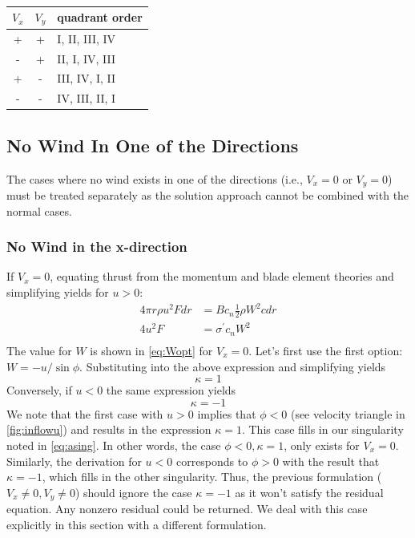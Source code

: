 \documentclass{article}
\begin{document}
\begin{table}[htb]
\centering
\caption{}
\label{tab:brackets}
\begin{tabular}{@{}ccl@{}}
\toprule
$V_x$ & $V_y$ & quadrant order \\
\midrule
+ & + & I, II, III, IV \\
- & + & II, I, IV, III \\
+ & - & III, IV, I, II \\
- & - & IV, III, II, I \\
\bottomrule
\end{tabular}
\end{table}



\subsection{No Wind In One of the Directions}

The cases where no wind exists in one of the directions (i.e., $V_x = 0$ or $V_y = 0$) must be treated separately as the solution approach cannot be combined with the normal cases.

\subsubsection{No Wind in the x-direction}
If $V_x = 0$, equating thrust from the momentum and blade element theories and simplifying yields for $u > 0$:
\begin{equation}
\begin{aligned}
    4 \pi r \rho u^2 F dr &= B c_n \frac{1}{2} \rho W^2 c dr\\
    4 u^2 F&= \sigma^\prime c_n W^2\\
\end{aligned}
\end{equation}
The value for $W$ is shown in \cref{eq:Wopt} for $V_x = 0$.  Let's first use the first option: $W = -u/\sin\phi$.  Substituting into the above expression and simplifying yields
\begin{equation}
\kappa = 1
\end{equation}
Conversely, if $u < 0$ the same expression yields
\begin{equation}
\kappa = -1
\end{equation}
We note that the first case with $u > 0$ implies that $\phi < 0$ (see velocity  triangle in \cref{fig:inflowu}) and results in the expression $\kappa = 1$.  This case fills in our singularity noted in \cref{eq:asing}.  In other words, the case $\phi < 0, \kappa = 1$, only exists for $V_x = 0$.  Similarly, the derivation for $u < 0$ corresponds to $\phi > 0$ with the result that $\kappa = -1$, which fills in the other singularity.  Thus, the previous formulation ($V_x \ne 0, V_y \ne 0$) should ignore the case $\kappa = -1$ as it won't satisfy the residual equation.  Any nonzero residual could be returned.  We deal with this case explicitly in this section with a different formulation.
\end{document}
